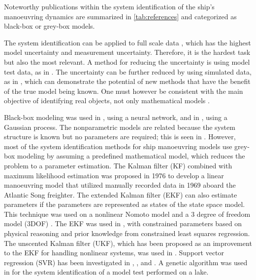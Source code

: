 Noteworthy publications within the system identification of the ship's manoeuvring dynamics are summarized in \autoref{tab:references} and categorized as black-box or grey-box models.
 
\noindent The system identification can be applied to full scale data \cite{astrom_identification_1976,perera_system_2015,revestido_herrero_two-step_2012}, which has the highest model uncertainty and measurement uncertainty. Therefore, it is the hardest task but also the most relevant. A method for reducing the uncertainty is using model test data, as in \cite{araki_estimating_2012,he_nonparametric_2022,xue_identification_2021,miller_ship_2021,luo_parameter_2016}. The uncertainty can be further reduced by using simulated data, as in \cite{shi_identification_2009,zhu_parameter_2017,wang_parameter_2021}, which can demonstrate the potential of new methods that have the benefit of the true model being known. One must however be consistent with the main objective of identifying real objects, not only mathematical models \cite{miller_ship_2021}.

\noindent Black-box modeling was used in \cite{he_nonparametric_2022}, using a neural network, and in \cite{xue_identification_2021}, using a Gaussian process. The nonparametric models are related because the system structure is known but no parameters are required; this is seen in \cite{pongduang_nonparametric_2020}. However, most of the system identification methods for ship manoeuvring models use grey-box modeling by assuming a predefined mathematical model, which reduces the problem to a parameter estimation.
The Kalman filter (KF) combined with maximum likelihood estimation was proposed in 1976 \cite{astrom_identification_1976} to develop a linear manoeuvring model that utilized manually recorded data in 1969 aboard the Atlantic Song freighter. The extended Kalman filter (EKF) can also estimate parameters if the parameters are represented as states of the state space model. This technique was used on a nonlinear Nomoto model \cite{perera_system_2015} and a 3 degree of freedom model (3DOF) \cite{shi_identification_2009}. The EKF was used in \cite{araki_estimating_2012}, with constrained parameters based on physical reasoning and prior knowledge from constrained least squares regression. The unscented Kalman filter (UKF), which has been proposed as an improvement to the EKF for handling nonlinear systems, was used in \cite{revestido_herrero_two-step_2012}.
Support vector regression (SVR) has been investigated in \cite{zhu_parameter_2017}, \cite{wang_parameter_2021}, and \cite{luo_parameter_2016}. A genetic algorithm was used in \cite{miller_ship_2021} for the system identification of a model test performed on a lake.





